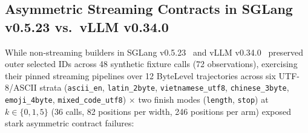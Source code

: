 \documentclass[11pt,letterpaper]{article}
\begin{document}
\subsection{Asymmetric Streaming Contracts in SGLang v0.5.23 vs.\ vLLM v0.34.0}
\label{sec:rq1-sglang-vllm}
While non-streaming builders in SGLang v0.5.23~\cite{sglangrel} and vLLM v0.34.0~\cite{vllm} preserved outer selected IDs across 48 synthetic fixture calls (72 observations), exercising their pinned streaming pipelines over 12 ByteLevel trajectories across six UTF-8/ASCII strata (\texttt{ascii\_en}, \texttt{latin\_2byte}, \texttt{vietnamese\_utf8}, \texttt{chinese\_3byte}, \texttt{emoji\_4byte}, \texttt{mixed\_code\_utf8}) $\times$ two finish modes (\texttt{length}, \texttt{stop}) at $k\in\{0,1,5\}$ (36 calls, 82 positions per width, 246 positions per arm) exposed stark asymmetric contract failures:
\end{document}

